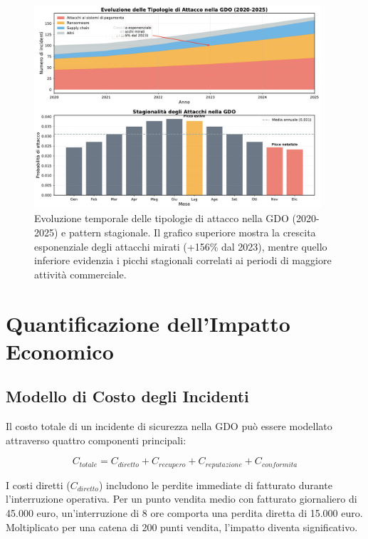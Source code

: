 \begin{figure}[htbp]
\centering
\includegraphics[width=0.95\textwidth]{thesis_figures/cap2/fig_2_3_evoluzione_attacchi.pdf}
\caption{Evoluzione temporale delle tipologie di attacco nella GDO (2020-2025) e pattern stagionale. Il grafico superiore mostra la crescita esponenziale degli attacchi mirati (+156\% dal 2023), mentre quello inferiore evidenzia i picchi stagionali correlati ai periodi di maggiore attività commerciale.}
\label{fig:evoluzione_attacchi}
\end{figure}

\section{Quantificazione dell'Impatto Economico}
\label{sec:cap2_impatto}

\subsection{Modello di Costo degli Incidenti}
\label{subsec:modello_costo}

Il costo totale di un incidente di sicurezza nella GDO può essere modellato attraverso quattro componenti principali:

\begin{equation}
\label{eq:costo_totale}
C_{totale} = C_{diretto} + C_{recupero} + C_{reputazione} + C_{conformita}
\end{equation}

I costi diretti ($C_{diretto}$) includono le perdite immediate di fatturato durante l'interruzione operativa. Per un punto vendita medio con fatturato giornaliero di 45.000 euro, un'interruzione di 8 ore comporta una perdita diretta di 15.000 euro. Moltiplicato per una catena di 200 punti vendita, l'impatto diventa significativo.

